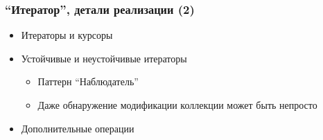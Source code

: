\documentclass{../../slides-style}
\begin{document}
    \begin{frame}
        \frametitle{``Итератор'', детали реализации (2)}
        \begin{itemize}
            \item Итераторы и курсоры
            \item Устойчивые и неустойчивые итераторы
            \begin{itemize}
                \item Паттерн ``Наблюдатель''
                \item Даже обнаружение модификации коллекции может быть непросто
            \end{itemize}
            \item Дополнительные операции
        \end{itemize}
    \end{frame}
\end{document}
